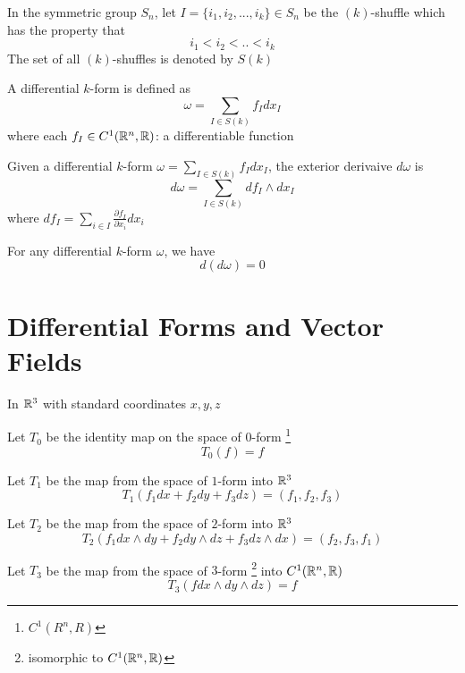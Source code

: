\documentclass{article}
\begin{document}
\begin{definition}
    In the symmetric group $S_n$, let $I = \{i_1, i_2, ..., i_k \} \in S_n$ be the $(k)$-shuffle which has the property that
    $$
        i_1 < i_2 < .. < i_k
    $$
    The set of all $(k)$-shuffles is denoted by $S(k)$
\end{definition}

\begin{definition}
    A differential $k$-form is defined as
    $$
        \omega = \sum_{I \in S(k)} f_I dx_I
    $$
    where each $f_I \in C^1(\mathbb{R}^n, \mathbb{R})$: a differentiable function
\end{definition}

\begin{definition}
    Given a differential $k$-form $\omega = \sum_{I \in S(k)} f_I dx_I$, the exterior derivaive $d\omega$ is
    $$
        d\omega = \sum_{I \in S(k)} df_I \wedge dx_I
    $$
    where $df_I = \sum_{i \in I} \frac{\partial f_I}{\partial x_i} dx_i$
\end{definition}

\begin{proposition}
    For any differential $k$-form $\omega$, we have
    $$
        d(d\omega) = 0
    $$
\end{proposition}

\section{Differential Forms and Vector Fields}

\begin{definition}[$T_0, T_1, T_2, T_3$]
In $\mathbb{R}^3$ with standard coordinates $x, y, z$

Let $T_0$ be the identity map on the space of $0$-form \footnote{$C^1(R^n, R)$}
$$
    T_0(f) = f
$$

Let $T_1$ be the map from the space of $1$-form into $\mathbb{R}^3$
$$
    T_1(f_1 dx + f_2 dy + f_3 dz) = (f_1, f_2, f_3)
$$

Let $T_2$ be the map from the space of $2$-form into $\mathbb{R}^3$
$$
    T_2(f_1 dx \wedge dy + f_2 dy \wedge dz + f_3 dz \wedge dx) = (f_2, f_3, f_1)
$$

Let $T_3$ be the map from the space of $3$-form \footnote{isomorphic to $C^1(\mathbb{R}^n, \mathbb{R})$} into $C^1(\mathbb{R}^n, \mathbb{R})$
$$
    T_3(f dx \wedge dy \wedge dz) = f
$$

\end{definition}
\end{document}
